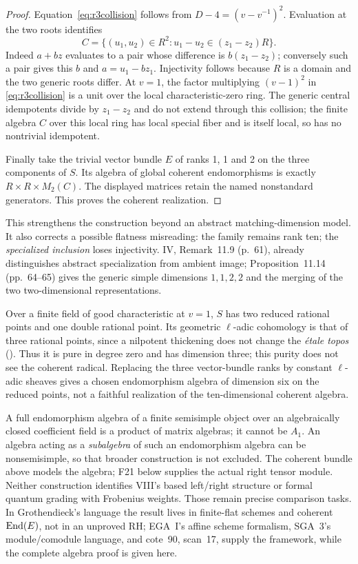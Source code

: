 \documentclass[11pt,a4paper]{article}
\newcommand{\fid}[1]{\textsf{#1}}\newcommand{\gate}[1]{\textsf{#1}}
\theoremstyle{named}\newtheorem{finding}{Finding}[section]
\theoremstyle{definition}\newtheorem{definition}[finding]{Definition}
\theoremstyle{remark}\newtheorem{remark}[finding]{Remark}
\begin{document}
\begin{proof}
Equation~\eqref{eq:r3collision} follows from $D-4=(v-v^{-1})^2$. Evaluation at the two roots identifies
\[
 C=\{(u_1,u_2)\in R^2:u_1-u_2\in(z_1-z_2)R\}.
\]
Indeed $a+bz$ evaluates to a pair whose difference is $b(z_1-z_2)$; conversely such a pair gives this $b$ and $a=u_1-bz_1$. Injectivity follows because $R$ is a domain and the two generic roots differ. At $v=1$, the factor multiplying $(v-1)^2$ in \eqref{eq:r3collision} is a unit over the local characteristic-zero ring. The generic central idempotents divide by $z_1-z_2$ and do not extend through this collision; the finite algebra $C$ over this local ring has local special fiber and is itself local, so has no nontrivial idempotent.

Finally take the trivial vector bundle $E$ of ranks 1, 1 and 2 on the three components of $S$. Its algebra of global coherent endomorphisms is exactly $R\times R\times M_2(C)$. The displayed matrices retain the named nonstandard generators. This proves the coherent realization.
\end{proof}
This strengthens the construction beyond an abstract matching-dimension model. It also corrects a possible flatness misreading: the family remains rank ten; the \emph{specialized inclusion} loses injectivity. IV, Remark~11.9 (p.~61), already distinguishes abstract specialization from ambient image; Proposition~11.14 (pp.~64--65) gives the generic simple dimensions $1,1,2,2$ and the merging of the two two-dimensional representations.

Over a finite field of good characteristic at $v=1$, $S$ has two reduced rational points and one double rational point. Its geometric \(\ell\)-adic cohomology is that of three rational points, since a nilpotent thickening does not change the \emph{\'etale topos} (\cite[Proposition~59.45.4, tag~03SI]{StacksNil}). Thus it is pure in degree zero and has dimension three; this purity does not see the coherent radical. Replacing the three vector-bundle ranks by constant \(\ell\)-adic sheaves gives a chosen endomorphism algebra of dimension six on the reduced points, not a faithful realization of the ten-dimensional coherent algebra.

A full endomorphism algebra of a finite semisimple object over an algebraically closed coefficient field is a product of matrix algebras; it cannot be $A_1$. An algebra acting as a \emph{subalgebra} of such an endomorphism algebra can be nonsemisimple, so that broader construction is not excluded. The coherent bundle above models the algebra; \fid{F21} below supplies the actual right tensor module. Neither construction identifies VIII's based left/right structure or formal quantum grading with Frobenius weights. Those remain precise comparison tasks. In Grothendieck's language the result lives in finite-flat schemes and coherent $\operatorname{End}(E)$, not in an unproved RH; EGA~I's affine scheme formalism, SGA~3's module/comodule language, and cote~90, scan~17, supply the framework, while the complete algebra proof is given here.
\end{document}
